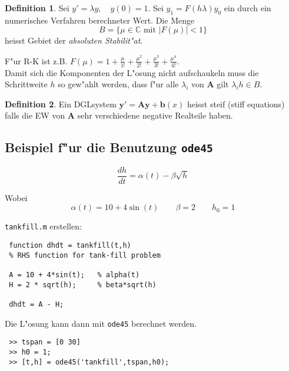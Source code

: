\documentclass[german, 10pt, a4paper, twocolumn]{scrartcl}
\theoremstyle{definition}
\newtheorem*{definition}{Definition}
\begin{document}
\begin{definition}
	Sei $y' = \lambda y, \quad y(0) = 1$. Sei $y_1 = F(h\lambda)y_0$ ein durch ein numerisches Verfahren berechneter Wert. Die Menge
	\begin{displaymath}
		B = \{ \mu \in \mathbb{C} \text{ mit } |F(\mu)| < 1 \}
	\end{displaymath}
	heisst Gebiet der \textit{absoluten Stabilit"at}.
\end{definition}

F"ur R-K ist z.B. $F(\mu) = 1 + \frac{\mu}{1!}+ \frac{\mu^2}{2!} +\frac{\mu^3}{3!} +\frac{\mu^4}{4!}$.\\

Damit sich die Komponenten der L"osung nicht aufschaukeln muss die Schrittweite $h$ so gew"ahlt werden, dass f"ur alle $\lambda_i$ von $\mathbf{A}$ gilt $\lambda_i h \in B$.

\begin{definition}
	Ein DGLsystem $\mathbf{y}' = \mathbf{Ay} + \mathbf{b}(x)$ heisst steif (stiff equations) falls die EW von $\mathbf{A}$ sehr verschiedene negative Realteile haben.
\end{definition}

\subsection{Beispiel f"ur die Benutzung \texttt{ode45}}

\begin{displaymath}
 \frac{dh}{dt} = \alpha(t) - \beta \sqrt{h}
\end{displaymath}

Wobei
\begin{displaymath}
 \alpha(t) = 10 + 4\sin(t) \qquad \beta=2 \qquad h_0 = 1
\end{displaymath}

\texttt{tankfill.m} erstellen:
\small
\begin{verbatim}
 function dhdt = tankfill(t,h)
 % RHS function for tank-fill problem

 A = 10 + 4*sin(t);   % alpha(t)
 H = 2 * sqrt(h);     % beta*sqrt(h)

 dhdt = A - H;
\end{verbatim}
\normalsize

Die L"osung kann dann mit \texttt{ode45} berechnet werden.
\small
\begin{verbatim}
 >> tspan = [0 30]
 >> h0 = 1;
 >> [t,h] = ode45('tankfill',tspan,h0);
\end{verbatim}
\normalsize
\end{document}
